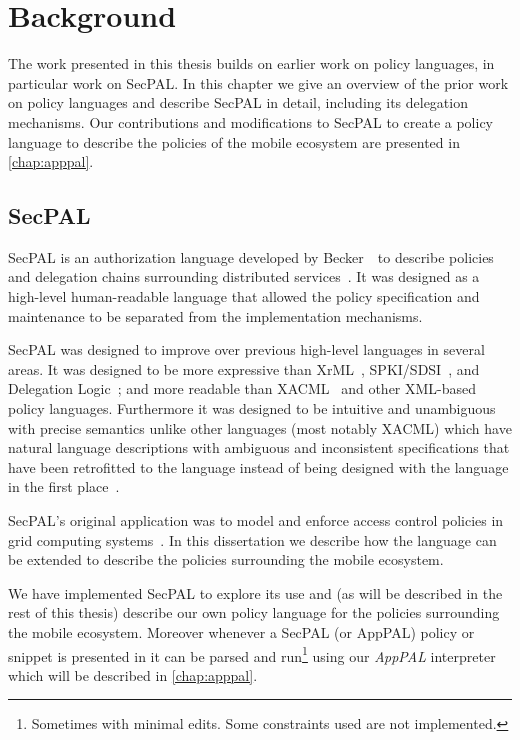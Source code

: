 \documentclass[thesis.tex]{subfiles}
\begin{document}
\chapter{Background}

The work presented in this thesis builds on earlier work on policy languages, in
particular work on SecPAL. In this chapter we give an overview of the prior work
on policy languages and describe SecPAL in detail, including its delegation
mechanisms. Our contributions and modifications to SecPAL to create a policy
language to describe the policies of the mobile ecosystem are presented in
\autoref{chap:apppal}.

\section{SecPAL}

SecPAL is an authorization language developed by Becker~\etal~to
describe policies and delegation chains surrounding distributed
services~\cite{becker_secpal:_2006}. It was designed as a high-level
human-readable language that allowed the policy specification and
maintenance to be separated from the implementation mechanisms.

SecPAL was designed to improve over previous high-level languages in several
areas. It was designed to be more expressive than
XrML~\cite{kolovski_logic-based_2007}, SPKI/SDSI~\cite{ellison_spki_1999}, and
Delegation Logic~\cite{li_delegation_2003}; and more readable than
XACML~\cite{oasis_extensible_2013} and other XML-based policy languages.
Furthermore it was designed to be intuitive and unambiguous with precise
semantics unlike other languages (most notably XACML) which have natural
language descriptions with ambiguous and inconsistent specifications that have
been retrofitted to the language instead of being designed with the language in
the first
place~\cite{bryans_reasoning_2005,ramli_logic_2014,masi_formalisation_2012}.

SecPAL's original application was to model and enforce access control
policies in grid computing systems~\cite{becker_secpal:_2006}.  In
this dissertation we describe how the language can be extended to
describe the policies surrounding the mobile ecosystem.

We have implemented SecPAL to explore its use and (as will be described in the
rest of this thesis) describe our own policy language for the policies
surrounding the mobile ecosystem. Moreover whenever a SecPAL (or AppPAL) policy
or snippet is presented in  it can be parsed
and run\footnote{Sometimes with minimal edits. Some constraints used are not
implemented.} using our \emph{AppPAL} interpreter which will be
described in \autoref{chap:apppal}.
\end{document}
